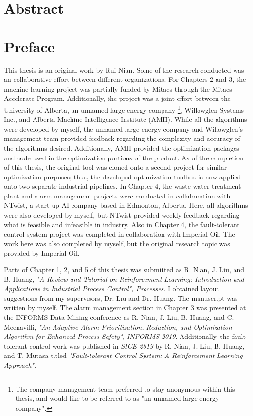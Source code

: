\documentclass[12pt]{report}
\begin{document}
\chapter*{Abstract}

\chapter*{Preface}
This thesis is an original work by Rui Nian. Some of the research conducted was an collaborative effort between different organizations.  For Chapters 2 and 3, the machine learning project was partially funded by Mitacs through the Mitacs Accelerate Program.  Additionally, the project was a joint effort between the University of Alberta, an unnamed large energy company \footnote{The company management team preferred to stay anonymous within this thesis, and would like to be referred to as "an unnamed large energy company".}, Willowglen Systems Inc., and Alberta Machine Intelligence Institute (AMII). While all the algorithms were developed by myself, the unnamed large energy company and Willowglen's management team provided feedback regarding the complexity and accuracy of the algorithms desired. Additionally, AMII provided the optimization packages and code used in the optimization portions of the product. As of the completion of this thesis, the original tool was cloned onto a second project for similar optimization purposes; thus, the developed optimization toolbox is now applied onto two separate industrial pipelines. In Chapter 4, the waste water treatment plant and alarm management projects were conducted in collaboration with NTwist, a start-up AI company based in Edmonton, Alberta. Here, all algorithms were also developed by myself, but NTwist provided weekly feedback regarding what is feasible and infeasible in industry. Also in Chapter 4, the fault-tolerant control system project was completed in collaboration with Imperial Oil. The work here was also completed by myself, but the original research topic was provided by Imperial Oil. 

Parts of Chapter 1, 2, and 5 of this thesis was submitted as R. Nian, J. Liu, and B. Huang, \textit{"A Review and Tutorial on Reinforcement Learning: Introduction and Applications in Industrial Process Control", Processes}.  I obtained layout suggestions from my supervisors, Dr. Liu and Dr. Huang.  The manuscript was written by myself. The alarm management section in Chapter 3 was presented at the INFORMS Data Mining conference as R. Nian, J. Liu, B. Huang, and C. Meenavilli, \textit{"An Adaptive Alarm Prioritization, Reduction, and Optimization Algorithm for Enhanced Process Safety", INFORMS 2019}.  Additionally, the fault-tolerant control work was published in \textit{SICE 2019} by R. Nian, J. Liu, B. Huang, and T. Mutasa titled \textit{"Fault-tolerant Control System: A Reinforcement Learning Approach"}.
\end{document}
